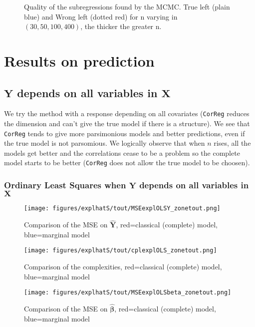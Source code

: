 \documentclass[12pt,a4paper]{report}
\begin{document}
\begin{figure}[h!]
	 \quad
	\caption{Quality of the subregressions found by the MCMC. True left (plain blue) and Wrong left (dotted red) for n varying in $(30,50,100,400)$, the thicker the greater n.}\label{compZBIC}
\end{figure}




\clearpage
\section{Results on prediction}\label{compY}
\subsection{$\boldsymbol{Y}$ depends on all variables in $\boldsymbol{X}$}	 	
We try the method with a response depending on all covariates ({\tt CorReg} reduces the dimension and can't give the true model if there is a structure). %
 We see that {\tt CorReg} tends to give more parsimonious models and better predictions, even if the true model is not parsomious. We logically observe that when $n$ rises, all the models get better and the correlations cease to be a problem so the complete model starts to be better ({\tt CorReg} does not allow the true model to be choosen).

 
\FloatBarrier

\newpage
\subsubsection{Ordinary Least Squares when $\boldsymbol{Y}$ depends on all variables in $\boldsymbol{X}$}

	\begin{figure}[h!]
	\centering
		  \texttt{[image: figures/explhatS/tout/MSEexplOLSY\_zonetout.png]}
		\caption{Comparison of the MSE on $\hat{\boldsymbol{Y}}$, red=classical (complete) model, blue=marginal model}\label{MSEexplOLSY_zonetout}
	\end{figure}
	\begin{figure}[h!]
	\centering
		  \texttt{[image: figures/explhatS/tout/cplexplOLS\_zonetout.png]}
		\caption{Comparison of the complexities, red=classical (complete) model, blue=marginal model}\label{cplexplOLS_zonetout}
	\end{figure}
	\begin{figure}[h!]
	\centering
		  \texttt{[image: figures/explhatS/tout/MSEexplOLSbeta\_zonetout.png]}
		\caption{Comparison of the MSE on $\hat{\boldsymbol{\beta}}$, red=classical (complete) model, blue=marginal model}\label{MSEexplOLSbeta_zonetout}
	\end{figure}
	\FloatBarrier
\newpage
\end{document}
